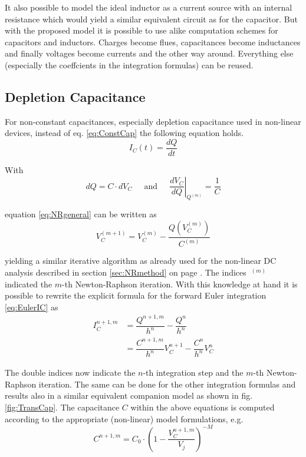 It also possible to model the ideal inductor as a current source with
an internal resistance which would yield a similar equivalent circuit
as for the capacitor.  But with the proposed model it is possible to
use alike computation schemes for capacitors and inductors.  Charges
become flues, capacitances become inductances and finally voltages
become currents and the other way around.  Everything else (especially
the coeffcients in the integration formulas) can be reused.

\subsection{Depletion Capacitance}

For non-constant capacitances, especially depletion capacitance used
in non-linear devices, instead of eq. \eqref{eq:ConstCap} the
following equation holds.
\begin{equation}
I_C(t) = \dfrac{d Q}{d t}
\end{equation}

With
\begin{equation}
d Q = C\cdot d V_C
\;\;\;\; \textrm{ and } \;\;\;\;
\left.\dfrac{d V_C}{d Q}\right|_{Q^{(m)}} = \dfrac{1}{C}
\end{equation}

equation \eqref{eq:NRgeneral} can be written as
\begin{equation}
V_C^{(m + 1)} = V_C^{(m)} - \dfrac{Q\left(V_C^{(m)}\right)}{C^{(m)}}
\end{equation}

yielding a similar iterative algorithm as already used for the
non-linear DC analysis described in section \ref{sec:NRmethod} on page
\pageref{sec:NRmethod}.  The indices $~^{(m)}$ indicated the $m$-th
Newton-Raphson iteration.  With this knowledge at hand it is possible
to rewrite the explicit formula for the forward Euler integration
\eqref{eq:EulerIC} as
\begin{equation}
\begin{split}
I_C^{n+1,m} &= \dfrac{Q^{n+1,m}}{h^{n}} - \dfrac{Q^{n}}{h^{n}}\\
&= \dfrac{C^{n+1,m}}{h^{n}} V_C^{n+1} - \dfrac{C^{n}}{h^{n}} V_C^{n}
\end{split}
\end{equation}

The double indices now indicate the $n$-th integration step and the
$m$-th Newton-Raphson iteration.  The same can be done for the other
integration formulas and results also in a similar equivalent
companion model as shown in fig. \ref{fig:TransCap}.  The capacitance
$C$ within the above equations is computed according to the
appropriate (non-linear) model formulations, e.g.
\begin{equation}
C^{n+1,m} = C_{0}\cdot \left(1 - \dfrac{V_{C}^{n+1,m}}{V_{j}}\right)^{-M}
\end{equation}

